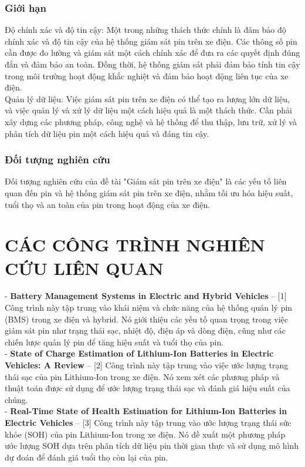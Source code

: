 \documentclass[a4paper,13pt]{article}
\theoremstyle{mytheor}
\begin{document}
\subsubsection{Giới hạn}
Độ chính xác và độ tin cậy: Một trong những thách thức chính là đảm bảo độ chính xác và độ tin cậy của hệ thống giám sát pin trên xe điện. Các thông số pin cần được đo lường và giám sát một cách chính xác để đưa ra các quyết định đúng đắn và đảm bảo an toàn. Đồng thời, hệ thống giám sát phải đảm bảo tính tin cậy trong môi trường hoạt động khắc nghiệt và đảm bảo hoạt động liên tục của xe điện.\\
Quản lý dữ liệu: Việc giám sát pin trên xe điện có thể tạo ra lượng lớn dữ liệu, và việc quản lý và xử lý dữ liệu một cách hiệu quả là một thách thức. Cần phải xây dựng các phương pháp, công nghệ và hệ thống để thu thập, lưu trữ, xử lý và phân tích dữ liệu pin một cách hiệu quả và đáng tin cậy.
\subsubsection{Đối tượng nghiên cứu }
Đối tượng nghiên cứu của đề tài "Giám sát pin trên xe điện" là các yếu tố liên quan đến pin và hệ thống giám sát pin trên xe điện, nhằm tối ưu hóa hiệu suất, tuổi thọ và an toàn của pin trong hoạt động của xe điện.

\section{CÁC CÔNG TRÌNH NGHIÊN CỨU LIÊN QUAN }
- \textbf{Battery Management Systems in Electric and Hybrid Vehicles} – [1] Công trình này tập trung vào khái niệm và chức năng của hệ thống quản lý pin (BMS) trong xe điện và hybrid. Nó giới thiệu các yếu tố quan trọng trong việc giám sát pin như trạng thái sạc, nhiệt độ, điện áp và dòng điện, cũng như các chiến lược quản lý pin để tăng hiệu suất và tuổi thọ của pin.\\

- \textbf{State of Charge Estimation of Lithium-Ion Batteries in Electric Vehicles: A Review} – [2] Công trình này tập trung vào việc ước lượng trạng thái sạc của pin Lithium-Ion trong xe điện. Nó xem xét các phương pháp và thuật toán được sử dụng để ước lượng trạng thái sạc và đánh giá hiệu suất của chúng.\\

- \textbf{Real-Time State of Health Estimation for Lithium-Ion Batteries in Electric Vehicles} – [3] Công trình này tập trung vào ước lượng trạng thái sức khỏe (SOH) của pin Lithium-Ion trong xe điện. Nó đề xuất một phương pháp ước lượng SOH dựa trên phân tích dữ liệu pin thời gian thực và sử dụng mô hình dự đoán để đánh giá tuổi thọ còn lại của pin.\\
\end{document}
